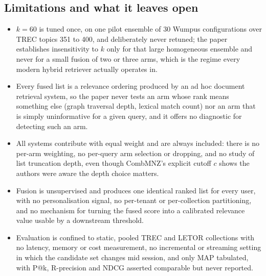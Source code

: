 \subsection{Limitations and what it leaves open}
\begin{itemize}[leftmargin=*, itemsep=1pt, topsep=2pt]
  \item $k=60$ is tuned once, on one pilot ensemble of 30 Wumpus configurations over TREC topics 351 to 400, and deliberately never retuned; the paper establishes insensitivity to $k$ only for that large homogeneous ensemble and never for a small fusion of two or three arms, which is the regime every modern hybrid retriever actually operates in.
  \item Every fused list is a relevance ordering produced by an ad hoc document retrieval system, so the paper never tests an arm whose rank means something else (graph traversal depth, lexical match count) nor an arm that is simply uninformative for a given query, and it offers no diagnostic for detecting such an arm.
  \item All systems contribute with equal weight and are always included: there is no per-arm weighting, no per-query arm selection or dropping, and no study of list truncation depth, even though CombMNZ's explicit cutoff $c$ shows the authors were aware the depth choice matters.
  \item Fusion is unsupervised and produces one identical ranked list for every user, with no personalisation signal, no per-tenant or per-collection partitioning, and no mechanism for turning the fused score into a calibrated relevance value usable by a downstream threshold.
  \item Evaluation is confined to static, pooled TREC and LETOR collections with no latency, memory or cost measurement, no incremental or streaming setting in which the candidate set changes mid session, and only MAP tabulated, with P@k, R-precision and NDCG asserted comparable but never reported.
\end{itemize}
